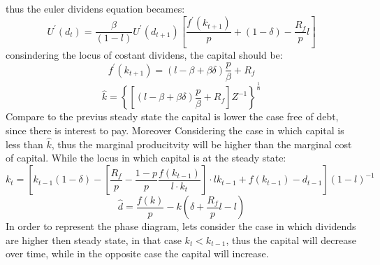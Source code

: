\documentclass[12pt]{article}
\begin{document}
thus the euler dividens equation becames:
\[U^{\prime}\left(d_{t}\right)=\frac{\beta}{\left(1-l\right)}
U^{\prime}\left(d_{t+1}\right)\left[\frac{f^{\prime}\left(k_{t+1}\right)}{p}+(1-\delta) - \frac{R_f}{p}l\right]\]
consindering the locus of costant dividens, the capital should be:
\[f^{\prime}\left(k_{t+1}\right) = \left(l - \beta + \beta \delta \right)\frac{p}{\beta}+R_f\]
\[\widehat{k} = \left\{\left[\left(l - \beta + \beta \delta \right)\frac{p}{\beta}+R_f\right]Z^{-1}\right\}^{\frac{1}{\alpha}}\]
Compare to the previus steady state the capital is lower the case free of debt, since there is interest to pay. Moreover
Considering the case in which capital is less than \(\widehat{k}\), thus the marginal producitvity will be higher than
the marginal cost of capital.
While the locus in which capital is at the steady state:
\[k_t = \left[k_{t-1}(1 - \delta) - \left[\frac{R_f}{p}  -\frac{ 1-p }{ p }\frac{f(k_{t-1})}{l \cdot k_t}\right] \cdot l k_{t-1} 
+ f(k_{t-1}) - d_{t-1}\right]{\left(1-l\right)}^{-1}\]
\[\widehat{d} =\frac{f(k)}{p} - k\left(\delta + \frac{R_f}{p}l -l\right)\]
In order to represent the phase diagram, lets consider the case in which dividends are higher then steady state, in that
case \(k_t<k_{t-1}\), thus the capital will decrease over time, while in the opposite case the capital will increase.
\end{document}

